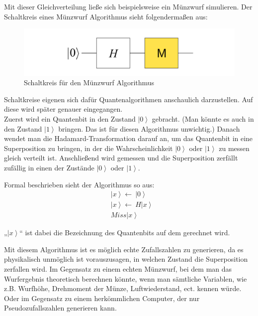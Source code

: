 Mit dieser Gleichverteilung ließe sich beispielsweise ein Münzwurf simulieren. Der Schaltkreis eines Münzwurf Algorithmus sieht folgendermaßen aus: \\

\begin{figure}[h]
    \centering
    \includegraphics[width=0.7\linewidth]{img/MuenzwurfSchaltkreis.png}
    \caption{Schaltkreis für den Münzwurf Algorithmus}
    \label{fig:Muenzwurf}
\end{figure}


Schaltkreise eigenen sich dafür Quantenalgorithmen anschaulich darzustellen. Auf diese wird später genauer eingegangen.\\

Zuerst wird ein Quantenbit in den Zustand $\left|0\right\rangle$ gebracht. (Man könnte es auch in den Zustand $\left|1\right\rangle$ bringen. Das ist für diesen Algorithmus unwichtig.) Danach wendet man die Hadamard-Transformation darauf an, um das Quantenbit in eine Superposition zu bringen, in der die Wahrscheinlichkeit $\left|0\right\rangle$ oder $\left|1\right\rangle$ zu messen gleich verteilt ist. Anschließend wird gemessen und die Superposition zerfällt zufällig in einen der Zustände $\left|0\right\rangle$ oder $\left|1\right\rangle$.

Formal beschrieben sieht der Algorithmus so aus:
\begin{align*}
    &\left|x\right\rangle \gets\ \left|0\right\rangle  \\
    &\left|x\right\rangle \gets\ H\left|x\right\rangle \\
    &Miss\left|x\right\rangle
\end{align*}

	
„$\left|x\right\rangle$“ ist dabei die Bezeichnung des Quantenbits auf dem gerechnet wird.

Mit diesem Algorithmus ist es möglich echte Zufallszahlen zu generieren, da es physikalisch unmöglich ist vorauszusagen, in welchen Zustand die Superposition zerfallen wird. Im Gegensatz zu einem echten Münzwurf, bei dem man das Wurfergebnis theoretisch berechnen könnte, wenn man sämtliche Variablen, wie z.B. Wurfhöhe, Drehmoment der Münze, Luftwiederstand, ect. kennen würde. Oder im Gegensatz zu einem herkömmlichen Computer, der nur Pseudozufallszahlen generieren kann. 
